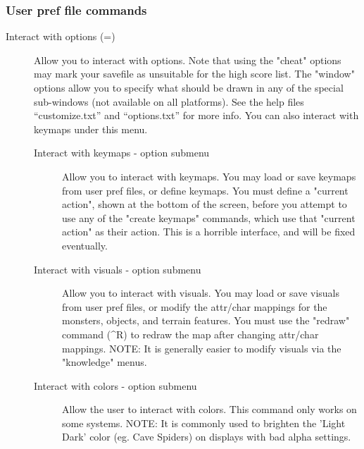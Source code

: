 \subsubsection{User pref file commands}
\begin{description}
\item[Interact with options (=)]
  Allow you to interact with options. Note that using the "cheat" options
  may mark your savefile as unsuitable for the high score list. The
  "window" options allow you to specify what should be drawn in any of the
  special sub-windows (not available on all platforms). See the help files
  ``customize.txt'' and ``options.txt'' for more info.  You can also
  interact with keymaps under this menu.
\begin{description}
\item[Interact with keymaps - option submenu]
  Allow you to interact with keymaps.  You may load or save keymaps from
  user pref files, or define keymaps. You must define a "current action",
  shown at the bottom of the screen, before you attempt to use any of the
  "create keymaps" commands, which use that "current action" as their
  action. This is a horrible interface, and will be fixed eventually.

\item[Interact with visuals - option submenu]
  Allow you to interact with visuals. You may load or save visuals from
  user pref files, or modify the attr/char mappings for the monsters,
  objects, and terrain features.  You must use the "redraw" command
  (\^{}R) to redraw the map after changing attr/char mappings.  NOTE: It
  is generally easier to modify visuals via the "knowledge" menus.

\item[Interact with colors - option submenu]
  Allow the user to interact with colors. This command only works on some
  systems.  NOTE: It is commonly used to brighten the 'Light Dark' color
  (eg. Cave Spiders) on displays with bad alpha settings.
\end{description}
\end{description}


